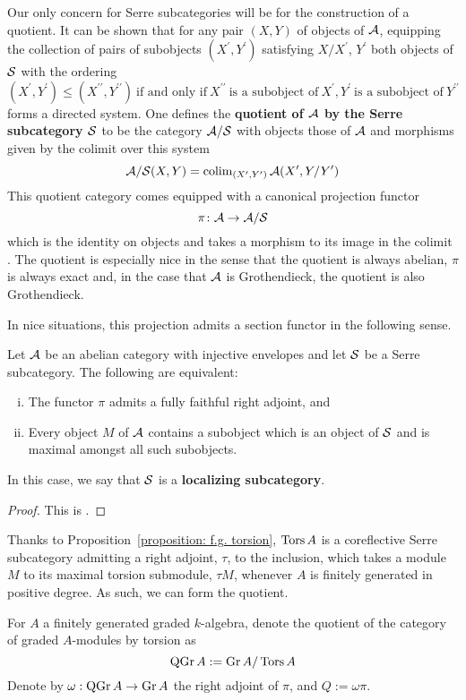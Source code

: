 Our only concern for Serre subcategories will be for the construction of a quotient.
It can be shown that for any pair \((X,Y)\) of objects of \(\mathcal{A}\), equipping the collection of pairs of subobjects \((X^\prime, Y^\prime)\) satisfying \(X/X^\prime\), \(Y^\prime\) both objects of \(\mathcal{S}\) with the ordering
\[(X^\prime, Y^\prime) \leq (X^{\prime\prime}, Y^{\prime\prime})\
\text{if and only if}\
X^{\prime\prime}\
\text{is a subobject of}\
X^\prime,Y^\prime\
\text{is a subobject of}\
Y^{\prime\prime}\]
forms a directed system.
One defines the \textbf{quotient of \(\mathcal{A}\) by the Serre subcategory \(\mathcal{S}\)} to be the category \(\mathcal{A}/\mathcal{S}\) with objects those of \(\mathcal{A}\) and morphisms given by the colimit over this system
\[\mathcal{A}/\mathcal{S}(X,Y) = \operatorname{colim}_{(X^\prime, Y^\prime)} \mathcal{A}(X^\prime, Y/Y^\prime)\]
This quotient category comes equipped with a canonical projection functor
\[\pi \colon \mathcal{A} \to \mathcal{A}/\mathcal{S}\]
which is the identity on objects and takes a morphism to its image in the colimit \parencite[Cor. 1, III.1]{DCA62}.
The quotient is especially nice in the sense that the quotient is always abelian, \(\pi\) is always exact and, in the case that \(\mathcal{A}\) is Grothendieck, the quotient is also Grothendieck.

In nice situations, this projection admits a section functor in the following sense.

\begin{proposition}\label{prop: existence of serre functor}
  Let \(\mathcal{A}\) be an abelian category with injective envelopes and let \(\mathcal{S}\) be a Serre subcategory.
  The following are equivalent:
  \begin{enumerate}[(i)]
  \item
    The functor \(\pi\) admits a fully faithful right adjoint, and
  \item
    Every object \(M\) of \(\mathcal{A}\) contains a subobject which is an object of \(\mathcal{S}\) and is maximal amongst all such subobjects.
  \end{enumerate}
  In this case, we say that \(\mathcal{S}\) is a \textbf{localizing subcategory}.
\end{proposition}

\begin{proof}
  This is \textcite[Cor. 1, III.3]{DCA62}.
\end{proof}

Thanks to Proposition~\ref{proposition: f.g. torsion}, \(\operatorname{Tors}A\) is a coreflective Serre subcategory admitting a right adjoint, \(\tau\), to the inclusion, which takes a module \(M\) to its maximal torsion submodule, \(\tau{M}\), whenever \(A\) is finitely generated in positive degree.
As such, we can form the quotient.
\begin{definition}
  For \(A\) a finitely generated graded \(k\)-algebra, denote the quotient of the category of graded \(A\)-modules by torsion as
  \begin{displaymath}
    \operatorname{QGr}A := \operatorname{Gr}A / \operatorname{Tors}A
  \end{displaymath}
  Denote by \(\omega : \operatorname{QGr}A \to \operatorname{Gr}A\) the right adjoint of \(\pi\), and \(Q := \omega\pi\).
\end{definition}

